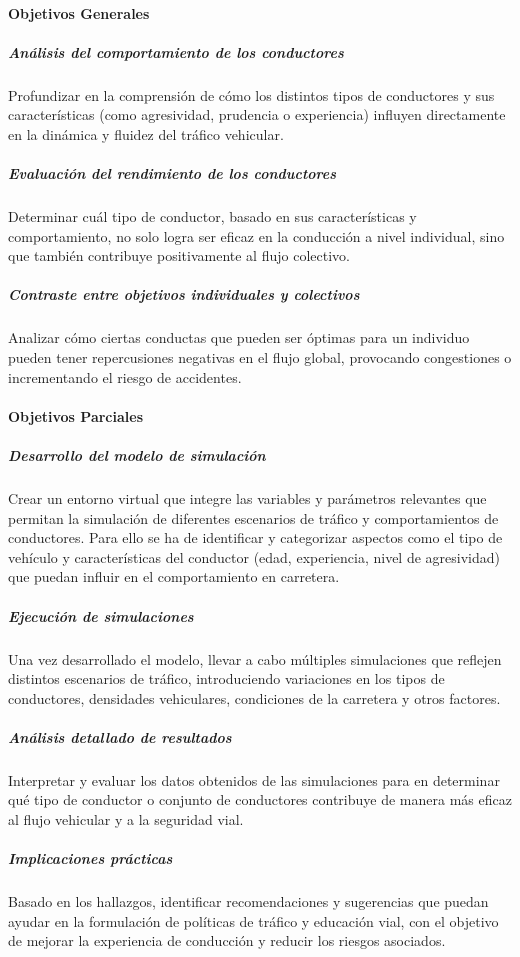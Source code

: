 \paragraph{Objetivos Generales}

\subparagraph{Análisis del comportamiento de los conductores}

Profundizar en la comprensión de cómo los distintos tipos de conductores y sus características (como agresividad, prudencia o experiencia) influyen
directamente en la dinámica y fluidez del tráfico vehicular.

\subparagraph{Evaluación del rendimiento de los conductores}

Determinar cuál tipo de conductor, basado en sus características y comportamiento,
no solo logra ser eficaz en la conducción a nivel individual, sino que también contribuye positivamente al flujo colectivo.

\subparagraph{Contraste entre objetivos individuales y colectivos}

Analizar cómo ciertas conductas que pueden ser óptimas para un individuo pueden tener repercusiones negativas en el flujo global,
provocando congestiones o incrementando el riesgo de accidentes.

\paragraph{Objetivos Parciales}

\subparagraph{Desarrollo del modelo de simulación}

Crear un entorno virtual que integre las variables y parámetros relevantes que permitan la simulación de
diferentes escenarios de tráfico y comportamientos de conductores. Para ello se ha de identificar y categorizar aspectos como el tipo de vehículo y
características del conductor (edad, experiencia, nivel de agresividad) que puedan influir en el comportamiento en carretera.

\subparagraph{Ejecución de simulaciones}

Una vez desarrollado el modelo, llevar a cabo múltiples simulaciones que reflejen distintos escenarios de tráfico,
introduciendo variaciones en los tipos de conductores, densidades vehiculares, condiciones de la carretera y otros factores.

\subparagraph{Análisis detallado de resultados}

Interpretar y evaluar los datos obtenidos de las simulaciones para en determinar qué
tipo de conductor o conjunto de conductores contribuye de manera más eficaz al flujo vehicular y a la seguridad vial.

\subparagraph{Implicaciones prácticas}

Basado en los hallazgos, identificar recomendaciones y sugerencias que puedan ayudar en la formulación
de políticas de tráfico y educación vial, con el objetivo de mejorar la experiencia de conducción y reducir los riesgos asociados.